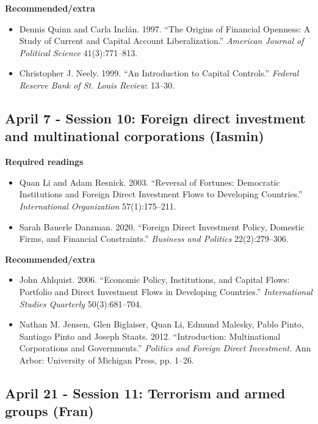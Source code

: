 \documentclass[12pt, a4paper]{article}
\begin{document}
\noindent \textbf{Recommended/extra}

\begin{itemize}
\item Dennis Quinn and Carla Inclán. 1997. ``The Origins of Financial Openness: A Study of Current and Capital Account Liberalization.'' \emph{American Journal of Political Science} 41(3):771--813.
\item Christopher J. Neely. 1999. ``An Introduction to Capital Controls.'' \emph{Federal Reserve Bank of St. Louis Review}: 13--30.
\end{itemize}

\subsection*{April 7 - Session 10: Foreign direct investment and multinational corporations (Iasmin)}

\noindent \textbf{Required readings}

\begin{itemize}
\item Quan Li and Adam Resnick. 2003. ``Reversal of Fortunes: Democratic Institutions and Foreign Direct Investment Flows to Developing Countries.'' \emph{International Organization} 57(1):175--211.
\item Sarah Bauerle Danzman. 2020. ``Foreign Direct Investment Policy, Domestic Firms, and Financial Constraints.'' \emph{Business and Politics} 22(2):279--306.
\end{itemize}

\noindent \textbf{Recommended/extra}

\begin{itemize}
\item John Ahlquist. 2006. ``Economic Policy, Institutions, and Capital Flows: Portfolio and Direct Investment Flows in Developing Countries.'' \emph{International Studies Quarterly} 50(3):681--704.
\item Nathan M. Jensen, Glen Biglaiser, Quan Li, Edmund Malesky, Pablo Pinto, Santiago Pinto and Joseph Staats. 2012. ``Introduction: Multinational Corporations and Governments.'' \emph{Politics and Foreign Direct Investment.} Ann Arbor: University of Michigan Press, pp. 1--26.
\end{itemize}

\subsection*{April 21 - Session 11: Terrorism and armed groups (Fran)}
\end{document}

